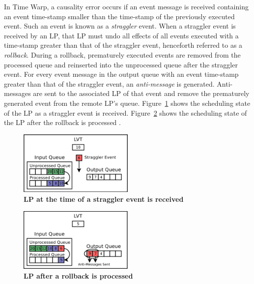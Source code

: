 \documentclass[11pt]{book}
\begin{document}
In Time Warp, a causality error occurs if an event message is received containing an event
time-stamp smaller than the time-stamp of the previously executed event.  Such an event is
known as a \emph{straggler} event.  When a straggler event is received by an LP, that LP
must undo all effects of all events executed with a time-stamp greater than that of the
straggler event, henceforth referred to as a \emph{rollback}.  During a rollback,
prematurely executed events are removed from the processed queue and reinserted into the
unprocessed queue after the straggler event.  For every event message in the output queue
with an event time-stamp greater than that of the straggler event, an \emph{anti-message}
is generated.  Anti-messages are sent to the associated LP of that event and remove the
prematurely generated event from the remote LP's queue.
Figure~\ref{fig:rollback_stragglerrecvd} shows the scheduling state of the LP as a
straggler event is received.  Figure~\ref{fig:rollback_processed} shows the scheduling
state of the LP after the rollback is processed \cite{dickman}.

\begin{figure}
    \centering
    \graphicspath{ {./figures/} }
    \includegraphics[width=0.5\textwidth,keepaspectratio]{rollback_recv}
    \caption{\textbf{LP at the time of a straggler event is
        received}}\label{fig:rollback_stragglerrecvd}
\end{figure}

\begin{figure}
    \centering
    \graphicspath{ {./figures/} }
    \includegraphics[width=0.5\textwidth,keepaspectratio]{rollback_processed}
    \caption{\textbf{LP after a rollback is processed}}\label{fig:rollback_processed}
\end{figure}
\end{document}
